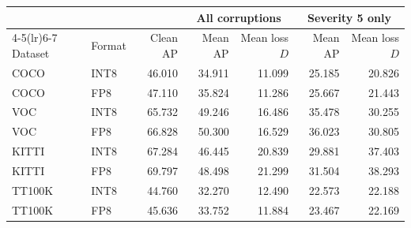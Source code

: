 \begin{tabular*}{\textwidth}{@{\extracolsep{\fill}}llrrrrr@{}}
\toprule
 & & & \multicolumn{2}{c}{All corruptions} & \multicolumn{2}{c}{Severity 5 only} \\
\cmidrule(lr){4-5}\cmidrule(lr){6-7}
Dataset & Format & Clean AP & Mean AP & Mean loss $D$ & Mean AP & Mean loss $D$ \\
\midrule
COCO & INT8 & 46.010 & 34.911 & 11.099 & 25.185 & 20.826 \\
COCO & FP8 & 47.110 & 35.824 & 11.286 & 25.667 & 21.443 \\
\addlinespace[4pt]
VOC & INT8 & 65.732 & 49.246 & 16.486 & 35.478 & 30.255 \\
VOC & FP8 & 66.828 & 50.300 & 16.529 & 36.023 & 30.805 \\
\addlinespace[4pt]
KITTI & INT8 & 67.284 & 46.445 & 20.839 & 29.881 & 37.403 \\
KITTI & FP8 & 69.797 & 48.498 & 21.299 & 31.504 & 38.293 \\
\addlinespace[4pt]
TT100K & INT8 & 44.760 & 32.270 & 12.490 & 22.573 & 22.188 \\
TT100K & FP8 & 45.636 & 33.752 & 11.884 & 23.467 & 22.169 \\
\bottomrule
\end{tabular*}
